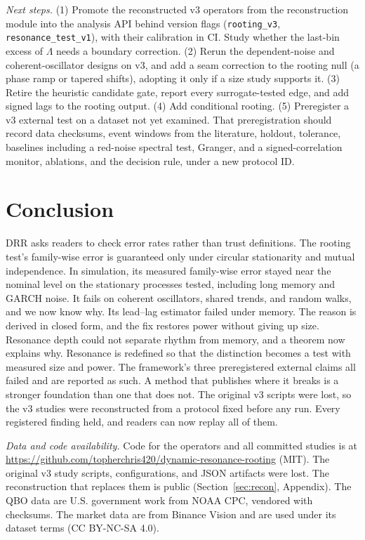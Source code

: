\documentclass[10pt,twocolumn,letterpaper]{article}
\theoremstyle{definition}
\theoremstyle{remark}
\newcommand{\code}[1]{\texttt{#1}}
\begin{document}
\textit{Next steps.} (1) Promote the reconstructed v3 operators from the
reconstruction module into the analysis API behind version flags
(\code{rooting\_v3}, \code{resonance\_test\_v1}), with their calibration in CI.
Study whether the last-bin excess of $\Lambda$ needs a boundary correction. (2) Rerun the dependent-noise and coherent-oscillator
designs on v3, and add a seam correction to the rooting null (a phase ramp or
tapered shifts), adopting it only if a size study supports it. (3) Retire the
heuristic candidate gate, report every surrogate-tested edge, and add signed
lags to the rooting output. (4) Add conditional rooting. (5) Preregister a v3
external test on a dataset not yet examined. That preregistration should record
data checksums, event windows from the literature, holdout, tolerance,
baselines including a red-noise spectral test, Granger, and a signed-correlation
monitor, ablations, and the decision rule, under a new protocol ID.

\section{Conclusion}

DRR asks readers to check error rates rather than trust definitions. The rooting
test's family-wise error is guaranteed only under circular stationarity and
mutual independence. In simulation, its measured family-wise error stayed near
the nominal level on the stationary processes tested, including long memory
and GARCH noise. It fails on coherent
oscillators, shared trends, and random walks, and we now know why. Its lead--lag
estimator failed under memory. The reason is derived in closed form, and the fix
restores power without giving up size. Resonance depth could not separate rhythm
from memory, and a theorem now explains why. Resonance is redefined so that the
distinction becomes a test with measured size and power. The framework's three
preregistered external claims all failed and are reported as such. A method that
publishes where it breaks is a stronger foundation than one that does not.
The original v3 scripts were lost, so the v3 studies were reconstructed from
a protocol fixed before any run. Every registered finding held, and readers can
now replay all of them.

\medskip
\noindent\textit{Data and code availability.} Code for the operators and all
committed studies is at
\url{https://github.com/topherchris420/dynamic-resonance-rooting} (MIT). The
original v3 study scripts, configurations, and JSON artifacts were lost. The
reconstruction that replaces them is public (Section~\ref{sec:recon},
Appendix). The QBO data are U.S. government work from NOAA CPC, vendored with
checksums. The market data are from Binance Vision and are used under its
dataset terms (CC BY-NC-SA 4.0).
\end{document}
